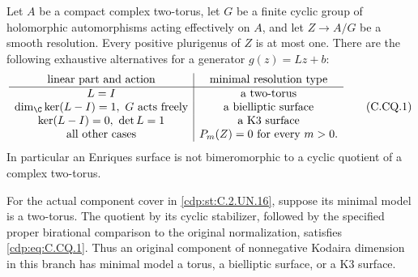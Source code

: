 \begin{proposition}\label{cdp:st:C.2.UN.23}

Let $A$ be a compact complex two-torus, let $G$ be a finite
cyclic group of holomorphic automorphisms acting effectively
on $A$, and let $Z\to A/G$ be a smooth resolution.
Every positive plurigenus of $Z$ is at most one. There are
the following exhaustive alternatives for a generator
$g(z)=Lz+b$:
\[
\begin{array}{c|c}
\text{linear part and action}&\text{minimal resolution type}\\ \hline
L=I&\text{a two-torus}\\
\dim_{\C}\ker(L-I)=1,\ G\text{ acts freely}
   &\text{a bielliptic surface}\\
\ker(L-I)=0,\ \det L=1&\text{a K3 surface}\\
\text{all other cases}&P_m(Z)=0\text{ for every }m>0 .
\end{array}                                                    \tag{C.CQ.1}\label{cdp:eq:C.CQ.1}
\]
In particular an Enriques surface is not bimeromorphic to
a cyclic quotient of a complex two-torus.

For the actual component cover in \ref{cdp:st:C.2.UN.16}, suppose its
minimal model is a two-torus. The quotient by its cyclic
stabilizer, followed by the specified proper birational
comparison to the original normalization, satisfies
\eqref{cdp:eq:C.CQ.1}. Thus an original component of nonnegative
Kodaira dimension in this branch has minimal model a
torus, a bielliptic surface, or a K3 surface.
\end{proposition}

